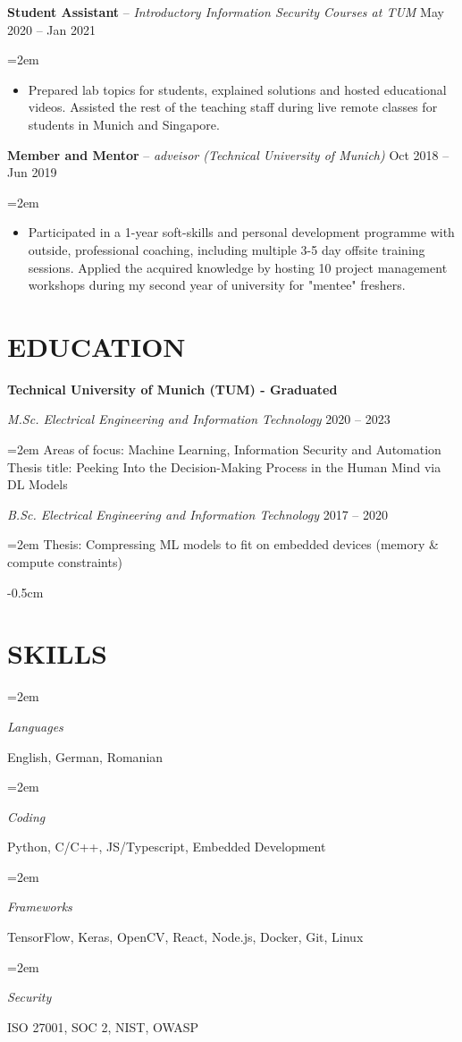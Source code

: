 \documentclass[paper=a4,fontsize=11pt]{scrartcl}
\newlength{\spacebox}
\newcommand{\sepspace}{\vspace*{0.35em}}		%
\newcommand{\NewPart}[1]{\section*{\uppercase{#1}}}
\newcommand{\PersonalEntry}[2]{
		\noindent\hangindent=2em\hangafter=0 %
		\parbox{\spacebox}{        %
		\textit{#1}}		       %
		\hspace{1.5em} #2 \par}    %
\newcommand{\SkillsEntry}[2]{      %
		\noindent\hangindent=2em\hangafter=0 %
		\parbox{\spacebox}{        %
		\textit{#1}}			   %
		\hspace{2.5em} #2 \par}    %
\newcommand{\EducationEntry}[4]{
		\noindent \textit{#1} \hfill      %
		\colorbox{custom_gray}{\color{white}#2} \par  %
		\noindent\hangindent=2em\hangafter=0 \small #3 %
		\normalsize \par}
\newcommand{\WorkEntry}[4]{				  %
		\noindent \textbf{#1} – \textit{#3} \hfill      %
		\colorbox{custom_gray}{\color{white}#2} \par  %
		\noindent\hangindent=2em\hangafter=0 \small #4 %
		\normalsize \par}
\begin{document}
\WorkEntry{Student Assistant}{May 2020 – Jan 2021}{Introductory Information Security Courses at TUM}
{
\begin{itemize}
  \item Prepared lab topics for students, explained solutions and hosted educational videos. Assisted the rest of the teaching staff during live remote classes for students in Munich and Singapore.
\end{itemize}
}

\WorkEntry{Member and Mentor}{Oct 2018 – Jun 2019}{adveisor (Technical University of Munich)}
{
\begin{itemize}
	\item Participated in a 1-year soft-skills and personal development programme with outside, professional coaching, including multiple 3-5 day offsite training sessions. Applied the acquired knowledge by hosting 10 project management workshops during my second year of university for "mentee" freshers.
\end{itemize}
}


\vspace{-0.5cm}
\NewPart{Education}{}
\vspace{-0.3cm}
\textbf{Technical University of Munich (TUM) - Graduated}

\EducationEntry{M.Sc. Electrical Engineering and Information Technology}{2020 – 2023}{Areas of focus: Machine Learning, Information Security and Automation \\
Thesis title: Peeking Into the Decision-Making Process in the Human Mind via DL Models}
\sepspace

\EducationEntry{B.Sc. Electrical Engineering and Information Technology}{2017 – 2020} {Thesis: Compressing ML models to fit on embedded devices (memory \& compute constraints)}


\vspace{-0.5cm}
\NewPart{Skills}{}

\SkillsEntry{Languages}{English, German, Romanian}
\SkillsEntry{Coding}{Python, \textsc{C/C++}, JS/Typescript, Embedded Development}
\SkillsEntry{Frameworks}{TensorFlow, Keras, OpenCV, React, Node.js, Docker, Git, Linux}
\SkillsEntry{Security}{ISO 27001, SOC 2, NIST, OWASP}


\end{document}
